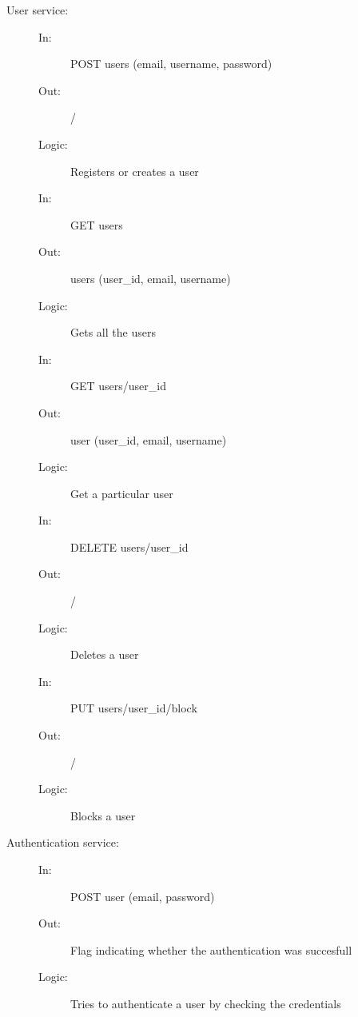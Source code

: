 \documentclass{article}
\begin{document}
\begin{description}
    \item [User service:] 
    \begin{description}
        \item[]
        \item[In:] POST users (email, username, password)
        \item[Out:] /
        \item[Logic:] Registers or creates a user
        \item[]
    \end{description}
    \begin{description}
        \item[In:] GET users
        \item[Out:] users (user\_id, email, username)
        \item[Logic:] Gets all the users
        \item[]
    \end{description}
    \begin{description}
        \item[In:] GET users/user\_id
        \item[Out:] user (user\_id, email, username)
        \item[Logic:] Get a particular user
        \item[]
    \end{description}
    \begin{description}
        \item[In:] DELETE users/user\_id
        \item[Out:] /
        \item[Logic:] Deletes a user
        \item[]
    \end{description}
    \begin{description}
        \item[In:] PUT users/user\_id/block
        \item[Out:] /
        \item[Logic:] Blocks a user
    \end{description}
\end{description}

\begin{description}
    \item [Authentication service:] 
    \begin{description}
        \item[]
        \item[In:] POST user (email, password)
        \item[Out:] Flag indicating whether the authentication was succesfull
        \item[Logic:] Tries to authenticate a user by checking the credentials
    \end{description}
\end{description}
\end{document}
